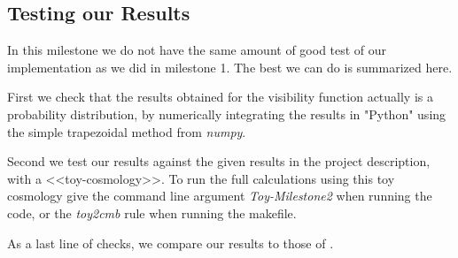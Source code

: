 \documentclass[10pt,a4paper]{article}
\begin{document}
\clearpage
\begin{appendices}
    \appendix
    \section{Testing our Results}
    In this milestone we do not have the same amount of good test of our implementation as we did in milestone 1. The best we can do is summarized here.

    First we check that the results obtained for the visibility function actually is a probability distribution, by numerically integrating the results in "Python" using the simple trapezoidal method from \textit{numpy}.

    Second we test our results against the given results in the project description\citep{project_description}, with a <<toy-cosmology>>. To run the full calculations using this toy cosmology give the command line argument \textit{Toy-Milestone2} when running the code, or the \textit{toy2cmb} rule when running the makefile.

    As a last line of checks, we compare our results to those of \cite{Calin}.

\end{appendices}
\end{document}
